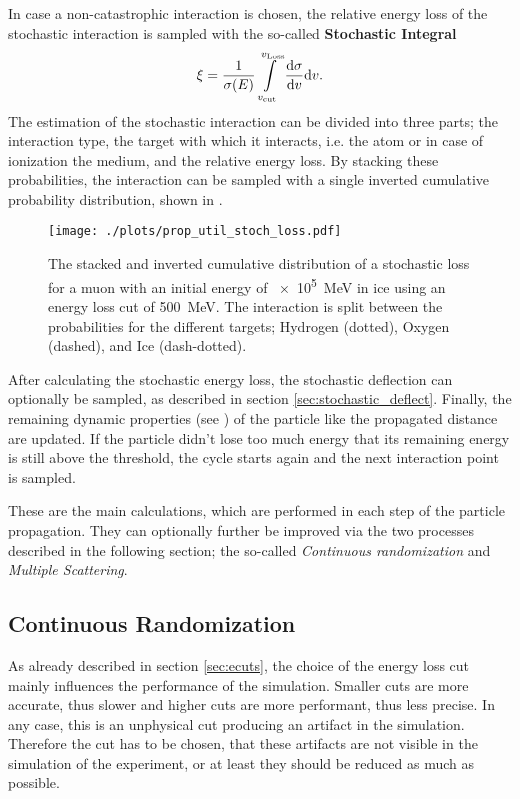 In case a non-catastrophic interaction is chosen, the relative energy loss of the stochastic interaction is sampled with the so-called \textbf{Stochastic Integral}
\begin{align}
    \xi = \frac{1}{\sigma(E)} \int\limits_{v_{\text{cut}}}^{v_{\text{Loss}}} \frac{\mathrm{d} \sigma}{\mathrm{d} v} \mathrm{d} v .
\end{align}
The estimation of the stochastic interaction can be divided into three parts; the interaction type, the target with which it interacts, i.e. the atom or in case of ionization the medium, and the relative energy loss.
By stacking these probabilities, the interaction can be sampled with a single inverted cumulative probability distribution, shown in .
\begin{figure}
    \centering
    \texttt{[image: ./plots/prop\_util\_stoch\_loss.pdf]}
    \caption{The stacked and inverted cumulative distribution of a stochastic loss for a muon with an initial energy of \SI{e5}{MeV} in ice using an energy loss cut of \SI{500}{MeV}. The interaction is split between the probabilities for the different targets; Hydrogen (dotted), Oxygen (dashed), and Ice (dash-dotted).}
    \label{fig:prop_util_stoch_loss}
\end{figure}

After calculating the stochastic energy loss, the stochastic deflection can optionally be sampled, as described in section \ref{sec:stochastic_deflect}.
Finally, the remaining dynamic properties (see ) of the particle like the propagated distance are updated.
If the particle didn't lose too much energy that its remaining energy is still above the threshold, the cycle starts again and the next interaction point is sampled.

These are the main calculations, which are performed in each step of the particle propagation.
They can optionally further be improved via the two processes described in the following section; the so-called \textit{Continuous randomization} and \textit{Multiple Scattering}.

\subsection{Continuous Randomization} \label{sec:cont_rand}

As already described in section \ref{sec:ecuts}, the choice of the energy loss cut mainly influences the performance of the simulation.
Smaller cuts are more accurate, thus slower and higher cuts are more performant, thus less precise. 
In any case, this is an unphysical cut producing an artifact in the simulation.
Therefore the cut has to be chosen, that these artifacts are not visible in the simulation of the experiment, or at least they should be reduced as much as possible.

